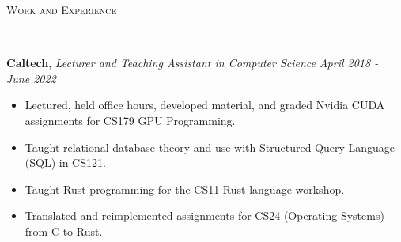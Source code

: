 \documentclass[9pt]{article}
\newenvironment{changemargin}[2]{%
  \begin{list}{}{%
    \setlength{\topsep}{0pt}%
    \setlength{\leftmargin}{#1}%
    \setlength{\rightmargin}{#2}%
    \setlength{\listparindent}{\parindent}%
    \setlength{\itemindent}{\parindent}%
    \setlength{\parsep}{\parskip}%
  }%
  \item[]}{\end{list}
}
\newcommand{\lineover}{
	\begin{changemargin}{-0.05in}{-0.05in}
		\vspace*{-8pt}
		\hrulefill \\
		\vspace*{-2pt}
	\end{changemargin}
}
\newcommand{\header}[1]{
	\begin{changemargin}{-0.5in}{-0.5in}
		\scshape{#1}\\
  	\lineover
	\end{changemargin}
}
\newenvironment{body} {
	\vspace*{-16pt}
	\begin{changemargin}{-0.25in}{-0.5in}
  }	
	{\end{changemargin}
}
\begin{document}
\header{Work and Experience}
\begin{body}
	\vspace{14pt}


	\textbf{Caltech}, \emph{Lecturer and Teaching Assistant in Computer Science} \hfill \emph{April 2018 - June 2022}\\
	\vspace*{-3pt}
	\begin{itemize} \itemsep -0pt %
		\item Lectured, held office hours, developed material, and graded Nvidia CUDA assignments for CS179 GPU Programming.
		\item Taught relational database theory and use with Structured Query Language
		      (SQL) in CS121.
		\item Taught Rust programming for the CS11 Rust language workshop.
		\item Translated and reimplemented assignments for CS24 (Operating
		Systems) from C to Rust.
	\end{itemize}
	\vspace*{-2pt}


\end{body}
\end{document}

